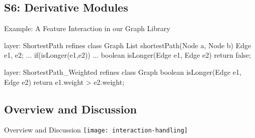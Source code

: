 \subsection{S6: Derivative Modules}

\begin{frame}{\myframetitle}
\end{frame}

\begin{frame}[fragile]{Example: A Feature Interaction in our Graph Library}
	\begin{mycolumns}[widths={50,50},animation=none]
\begin{codetight}{layer: ShortestPath}
refines class Graph {
	List shortestPath(Node a, Node b){
		Edge e1, e2;
		...
		if(isLonger(e1,e2)) 
		... 
	}
	boolean isLonger(Edge e1, Edge e2){
		return false;
	}
}
\end{codetight}	
	\mynextcolumn
\begin{codetight}{layer: ShortestPath\_Weighted}
refines class Graph {
	boolean isLonger(Edge e1, Edge e2){
		return e1.weight > e2.weight;
	}
}
\end{codetight}	
	\end{mycolumns}
\end{frame}

\subsection{Overview and Discussion}

\begin{frame}{Overview and Discussion}
	\centering\texttt{[image: interaction-handling]}
\end{frame}


